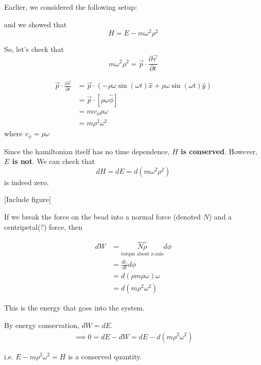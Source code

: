 \documentclass[11pt]{article}
\begin{document}
\vskip 0.5cm
Earlier, we considered the following setup:


\vskip 0.5cm
and we showed that 
\[ H = E - m\omega^2 \rho^2 \]

So, let's check that 
\[ m\omega^2 \rho^2 = \vec{p} \cdot \frac{\partial \vec{r}}{\partial t} \]

\begin{bluebox}
\begin{align*}
  \vec{p} \cdot \frac{\partial \vec{r}}{\partial t} &= \vec{p} \cdot \left( -\rho \omega \sin(\omega t) \hat{x} + \rho \omega \sin(\omega t) \hat{y} \right) \\
  &= \vec{p} \cdot \left[ \rho  \omega \hat{\phi} \right] \\
  &= m v_{\phi} \rho \omega \\
  &= m \rho^2 \omega^2 
\end{align*}
where $v_{\phi} = \rho \omega$
\end{bluebox}

Since the hamiltonian itself has no time dependence, \textbf{$H$ is conserved}. However, \textbf{$E$ is not}. We can check that 
\[ dH = dE = d(m \omega^2 \rho^2) \] is indeed zero. 

\vskip 0.5cm
[Include figure]

\vskip 0.5cm
\begin{bluebox}
  If we break the force on the bead into a normal force (denoted $N$) and a centripetal(?) force, then

\begin{align*}
  dW &= \overbrace{N \rho}_{\text{torque about z-axis}} d\phi \\
  &= \frac{d {l}_z}{dt} d\phi \\
  &= d \left(\rho m \rho \omega\right) \omega \\
  &= d\left(m \rho^2 \omega^2\right)
\end{align*}

This is the energy that goes into the system.

\vskip 0.5cm
By energy conservation, $dW = dE$.
\begin{align*}
  \implies 0 = dE - dW = dE - d(m\rho^2 \omega^2)
\end{align*}

i.e. $E - m\rho^2 \omega^2 = H$ is a conserved quantity.
\end{bluebox}
\end{document}
